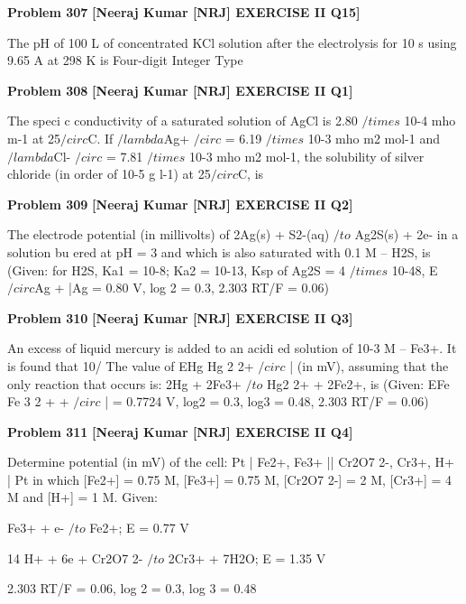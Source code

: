 \begin{problembox}
\textbf{Problem 307} \hfill \textbf{[Neeraj Kumar [NRJ] EXERCISE II Q15]}
\label{q:ext-nrj_all_questions-307}

The pH of 100 L of concentrated KCl solution 
after the electrolysis for 10 s using 9.65 A at 
298 K is
Four-digit Integer Type
\end{problembox}

\begin{problembox}
\textbf{Problem 308} \hfill \textbf{[Neeraj Kumar [NRJ] EXERCISE II Q1]}
\label{q:ext-nrj_all_questions-308}

The speci  c conductivity of a saturated solution 
of AgCl is 2.80 $/times$ 10-4 mho m-1 at 25$/circ$C. If $/lambda$Ag+
$/circ$
= 
6.19 $/times$ 10-3 mho m2 mol-1 and $/lambda$Cl-
$/circ$
= 7.81 $/times$ 10-3 
mho m2 mol-1, the solubility of silver chloride (in 
order of 10-5 g l-1) at 25$/circ$C, is
\end{problembox}

\begin{problembox}
\textbf{Problem 309} \hfill \textbf{[Neeraj Kumar [NRJ] EXERCISE II Q2]}
\label{q:ext-nrj_all_questions-309}

The electrode potential (in millivolts) of 2Ag(s) + 
S2-(aq) $/to$ Ag2S(s) + 2e- in a solution bu  ered at 
pH = 3 and which is also saturated with 0.1 M -- 
H2S, is (Given: for H2S, Ka1 = 10-8; Ka2 = 10-13, Ksp 
of Ag2S = 4 $/times$ 10-48, E $/circ$Ag
+
|Ag = 0.80 V, log 2 = 0.3, 
2.303 RT/F = 0.06)
\end{problembox}

\begin{problembox}
\textbf{Problem 310} \hfill \textbf{[Neeraj Kumar [NRJ] EXERCISE II Q3]}
\label{q:ext-nrj_all_questions-310}

An excess of liquid mercury is added to an 
acidi  ed solution of 10-3 M -- Fe3+. It is found 
that 10/%
The value of EHg
Hg
2
2+
$/circ$
|
(in mV), assuming that the 
only reaction that occurs is: 2Hg + 2Fe3+ $/to$ Hg2
2+ 
+ 2Fe2+, is (Given: EFe
Fe
3
2
+
+
$/circ$
|
= 0.7724 V, log2 = 0.3, 
log3 = 0.48, 2.303 RT/F = 0.06)
\end{problembox}

\begin{problembox}
\textbf{Problem 311} \hfill \textbf{[Neeraj Kumar [NRJ] EXERCISE II Q4]}
\label{q:ext-nrj_all_questions-311}

Determine potential (in mV) of the cell: Pt | Fe2+, 
Fe3+ || Cr2O7
2-, Cr3+, H+ | Pt in which [Fe2+] = 0.75 
M, [Fe3+] = 0.75 M, [Cr2O7
2-] = 2 M, [Cr3+] = 4 M 
and [H+] = 1 M. Given:
 
  Fe3+ + e- $/to$ Fe2+; E  = 0.77 V
 
   14 H+ + 6e + Cr2O7
2- $/to$  2Cr3+ + 7H2O; 
E  = 1.35 V
 
  2.303 RT/F = 0.06, log 2 = 0.3, log 3 = 0.48
\end{problembox}

